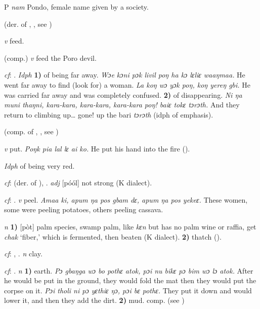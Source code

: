 \begin{letter}{P}
 \textit{nam} Pondo, female name given by a society. 

 (der. of , , see ) 

 \textit{v} feed.

 (comp.) \textit{v} feed the Poro devil.

 \textit{cf}: . \textit{Idph} \textbf{1)} of being far away. \textit{Wɔe kɔni pɔk livil poŋ ha kɔ lɛliɛ waaŋmaa.} He went far away to find (look for) a woman. \textit{La koŋ wɔ yɔk poŋ, koŋ yereŋ gbi.} He was carried far away and was completely confused. \textbf{2)} of disappearing. \textit{Ni ŋa muni thaŋni, kara-kara, kara-kara, kara-kara poŋ! baiɛ tokɛ tɔrɔth.} And they return to climbing up… gone! up the bari \textit{tɔrɔth} (idph of emphasis).

 (comp. of , , see ) 

 \textit{v} put. \textit{Poŋk pia lal lɛ ai ko.} He put his hand into the fire (\citealt{Pichl1967}).

 \textit{Idph} of being very red.

 \textit{cf}:  (der. of ), . \textit{adj} [póól] not strong (K dialect).

 \textit{cf}: . \textit{v} peel. \textit{Amaa ki, apum ŋa pos gbam dɛ, apum ŋa pos yekeɛ.} These women, some were peeling potatoes, others peeling cassava.

 \textit{n} \textbf{1)} [pòt] palm species, swamp palm, like \textit{kɛn} but has no palm wine or raffia, get \textit{chak} ‘fiber,' which is fermented, then beaten (K dialect). \textbf{2)} thatch (\citealt{Pichl1967}).

 \textit{cf}: , . \textit{n} clay.

 \textit{cf}: . \textit{n} \textbf{1)} earth. \textit{Pɔ gbaŋga wɔ bo pothɛ atok, pɔi nu bikɛ pɔ bim wɔ lɔ atok.} After he would be put in the ground, they would fold the mat then they would put the corpse on it. \textit{Pɔi tholi ni pɔ yɛthiɛ ŋɔ, pɔi bɛ pothɛ.} They put it down and would lower it, and then they add the dirt. \textbf{2)} mud. comp.  (see ) 


\end{letter}
